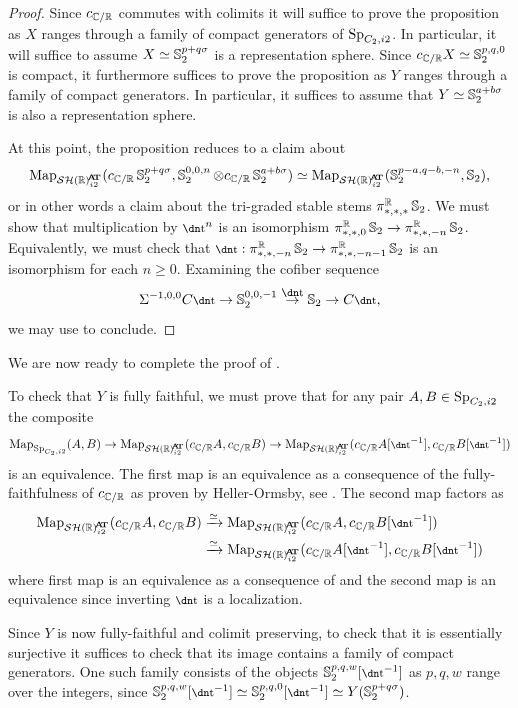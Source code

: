 \begin{proof}
  Since $c_{\mathbb{C}/\mathbb{R}} $ commutes with colimits it will suffice to prove the proposition as $X$ ranges through a family of compact generators of $\operatorname{\mathrm{Sp}}_{C_2, i2}$. In particular, it will suffice to assume $X \simeq \operatorname{\mathbb{S}}_2^{p+q\sigma}$ is a representation sphere.  Since $c_{\mathbb{C}/\mathbb{R}} X \simeq \operatorname{\mathbb{S}}^{p,q,0} _2$ is compact, it furthermore suffices to prove the proposition as $Y$ ranges through a family of compact generators. In particular, it suffices to assume that $Y \simeq \operatorname{\mathbb{S}}^{a+b\sigma}_2$ is also a representation sphere. 
	
  At this point, the proposition reduces to a claim about 
  $$\Map_{\SHRat}(c_{\C/\R} \Ss_2^{p+q\sigma}, \Ss_2^{0,0,n} \otimes c_{\C/\R} \Ss_2^{a+b\sigma}) \simeq \Map_{\SHRat}(\Ss_2^{p-a,q-b,-n},\Ss_2),$$
  or in other words a claim about the tri-graded stable stems $\pi^{\mathbb{R}}_{*,*,*} \operatorname{\mathbb{S}}_2$.  We must show that multiplication by $\ta^n$ is an isomorphism $\pi^{\mathbb{R}}_{*,*,0} \operatorname{\mathbb{S}}_2 \to \pi^{\mathbb{R}}_{*,*,-n} \operatorname{\mathbb{S}}_2$.  Equivalently, we must check that $\ta:\pi^{\R}_{*,*,-n} \Ss_2 \to \pi^{\R}_{*,*,-n-1} \Ss_2$ is an isomorphism for each $n \ge 0$.  Examining the cofiber sequence
  \[\Sigma^{-1,0,0} C\ta \to \Ss_2^{0,0,-1} \stackrel{\ta}{\to} \Ss_2 \to C\ta, \]
  we may use  to conclude.
\end{proof}


We are now ready to complete the proof of .

  To check that $Y$ is fully faithful, we must prove that for any pair $A, B \in \operatorname{\mathrm{Sp}}_{C_2,i2}$ the composite
\[ \Map_{\Sp_{C_2,i2}}(A,B) \to \Map_{\SHRat}(c_{\C/\R}A, c_{\C/\R}B) \to \Map_{\SHRat}(c_{\C/\R}A [\ta^{-1}], c_{\C/\R}B [\ta^{-1}]) \]
is an equivalence. The first map is an equivalence as a consequence of the fully-faithfulness of $c_{\mathbb{C}/\mathbb{R}}$ as proven by Heller-Ormsby, see . The second map factors as
\begin{align*}
  \Map_{\SHRat}(c_{\C/\R}A, c_{\C/\R}B)
  &\xrightarrow{\simeq} \Map_{\SHRat}(c_{\C/\R}A, c_{\C/\R}B [\ta^{-1}]) \\
  &\xrightarrow{\simeq} \Map_{\SHRat}(c_{\C/\R}A [\ta^{-1}], c_{\C/\R}B [\ta^{-1}])
\end{align*}
where first map is an equivalence as a consequence of 
and the second map is an equivalence since inverting $\ta$ is a localization.

Since $Y$ is now fully-faithful and colimit preserving, to check that it is essentially surjective it suffices to check that its image contains a family of compact generators. One such family consists of the objects $\Ss^{p,q,w}_2[\ta^{-1}]$ as $p,q,w$ range over the integers, since $\Ss_2^{p,q,w}[\ta^{-1}] \simeq \Ss_2^{p,q,0}[\ta^{-1}] \simeq Y(\Ss_2^{p+q\sigma})$.
